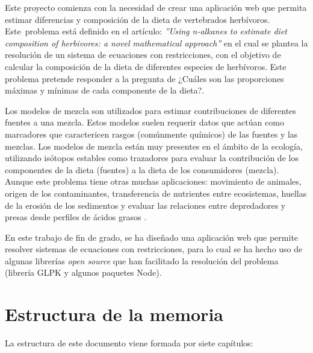 
Este proyecto comienza con la necesidad de crear una aplicación web que permita estimar diferencias y composición de la dieta de vertebrados herbívoros. Este problema está definido en el artículo: \emph{''Using n-alkanes to estimate diet composition of herbivores: a novel mathematical approach''} \cite{problemn-alkanes2007} en el cual se plantea la resolución de un sistema de ecuaciones con restricciones, con el objetivo de calcular la composición de la dieta de diferentes especies de herbívoros. Este problema pretende responder a la pregunta de ¿Cuáles son las proporciones máximas y mínimas de cada componente de la dieta?.

Los modelos de mezcla son utilizados para estimar contribuciones de diferentes fuentes a una mezcla. Estos modelos suelen requerir datos que actúan como marcadores que caractericen rasgos (comúnmente químicos) de las fuentes y las mezclas. Los modelos de mezcla están muy presentes en el ámbito de  la ecología, utilizando isótopos estables como trazadores para evaluar la contribución de los componentes de la dieta (fuentes) a la dieta de los consumidores (mezcla). Aunque este problema tiene otras muchas aplicaciones: movimiento de animales, origen de los contaminantes, transferencia de nutrientes entre ecosistemas, huellas de la erosión de los sedimentos y evaluar las relaciones entre depredadores y presas desde perfiles de ácidos grasos \cite{bicknell:2014,bartov:2012,granek:2009,blake:2012,neubauer:2015}.

En este trabajo de fin de grado, se ha diseñado una aplicación web que permite resolver sistemas de ecuaciones con restricciones, para lo cual se ha hecho uso de algunas librerías \emph{open source} que han facilitado la resolución del problema (librería GLPK \cite{glpk:package} y algunos paquetes Node). 

\section{Estructura de la memoria}

La estructura de este documento viene formada por siete capítulos:

